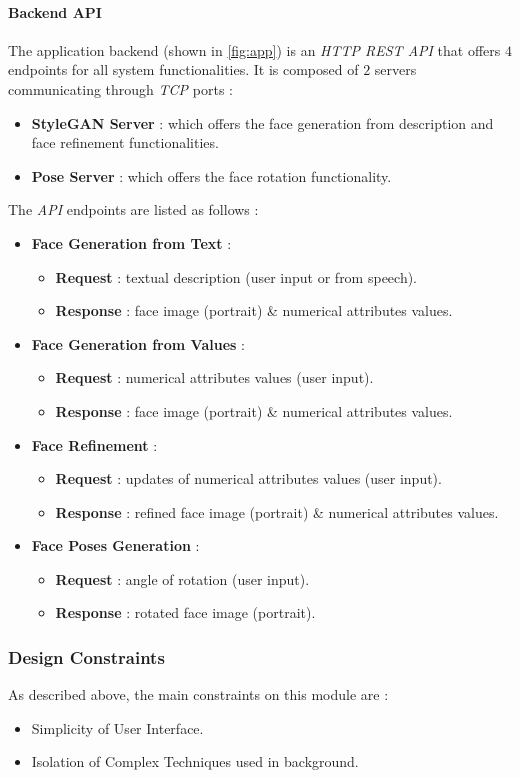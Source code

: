 \paragraph{Backend API}
The application backend (shown in \ref{fig:app}) is an \emph{HTTP REST API} that offers $4$ endpoints for all system functionalities. It is composed of $2$ servers communicating through \emph{TCP} ports :
\begin{itemize}
    \item \textbf{StyleGAN Server} : which offers the face generation from description and face refinement functionalities.
    \item \textbf{Pose Server} : which offers the face rotation functionality.
\end{itemize}

The \emph{API} endpoints are listed as follows :
\begin{itemize}
    \item \textbf{Face Generation from Text} :
    \begin{itemize}
        \item \textbf{Request} : textual description (user input or from speech).
        \item \textbf{Response} : face image (portrait) \& numerical attributes values.
    \end{itemize}
    \item \textbf{Face Generation from Values} :
    \begin{itemize}
        \item \textbf{Request} : numerical attributes values (user input).
        \item \textbf{Response} : face image (portrait) \& numerical attributes values.
    \end{itemize}
    \item \textbf{Face Refinement} :
    \begin{itemize}
        \item \textbf{Request} : updates of numerical attributes values (user input).
        \item \textbf{Response} : refined face image (portrait) \& numerical attributes values.
    \end{itemize}
    \item \textbf{Face Poses Generation} :
    \begin{itemize}
        \item \textbf{Request} : angle of rotation (user input).
        \item \textbf{Response} : rotated face image (portrait).
    \end{itemize}
\end{itemize}

\subsubsection{Design Constraints}
As described above, the main constraints on this module are :

\begin{itemize}
    \item Simplicity of User Interface.
    \item Isolation of Complex Techniques used in background.
\end{itemize}
